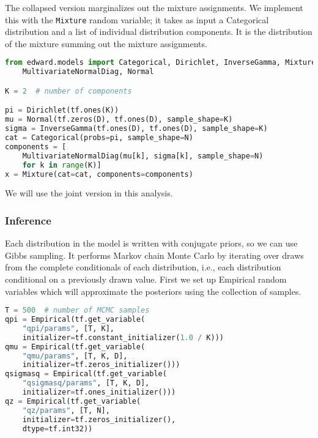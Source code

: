 The collapsed version marginalizes out the mixture assignments. We
implement this with the \texttt{Mixture} random variable; it takes as
input a Categorical distribution and a list of individual distribution
components. It is the distribution of the mixture summing out the
mixture assignments.

\begin{lstlisting}[language=Python]
from edward.models import Categorical, Dirichlet, InverseGamma, Mixture, \
    MultivariateNormalDiag, Normal

K = 2  # number of components

pi = Dirichlet(tf.ones(K))
mu = Normal(tf.zeros(D), tf.ones(D), sample_shape=K)
sigma = InverseGamma(tf.ones(D), tf.ones(D), sample_shape=K)
cat = Categorical(probs=pi, sample_shape=N)
components = [
    MultivariateNormalDiag(mu[k], sigma[k], sample_shape=N)
    for k in range(K)]
x = Mixture(cat=cat, components=components)
\end{lstlisting}

We will use the joint version in this analysis.

\subsubsection{Inference}

Each distribution in the model is written with conjugate priors, so we
can use Gibbs sampling. It performs Markov chain Monte Carlo by
iterating over draws from the complete conditionals of each
distribution, i.e., each distribution conditional on a previously
drawn value. First we set up Empirical random variables which will
approximate the posteriors using the collection of samples.

\begin{lstlisting}[language=Python]
T = 500  # number of MCMC samples
qpi = Empirical(tf.get_variable(
    "qpi/params", [T, K],
    initializer=tf.constant_initializer(1.0 / K)))
qmu = Empirical(tf.get_variable(
    "qmu/params", [T, K, D],
    initializer=tf.zeros_initializer()))
qsigmasq = Empirical(tf.get_variable(
    "qsigmasq/params", [T, K, D],
    initializer=tf.ones_initializer()))
qz = Empirical(tf.get_variable(
    "qz/params", [T, N],
    initializer=tf.zeros_initializer(),
    dtype=tf.int32))
\end{lstlisting}


